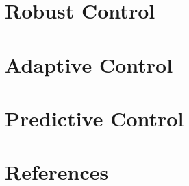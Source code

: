 \documentclass[a4paper, 12pt, use style=flow, title in boldface, theorem in new line, emphasize theorems]{einfart} %
\numberwithin{equation}{section}
\begin{document}
\newpage
\section{Robust Control}

\newpage
\section{Adaptive Control}

\newpage
\section{Predictive Control}

\newpage


\newpage


\newpage


\newpage


\newpage
\section{References}
\end{document}

